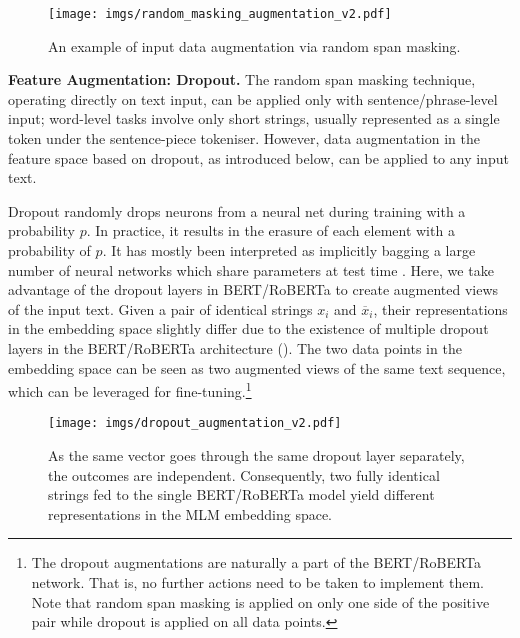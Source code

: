 \documentclass[11pt]{article}
\begin{document}
\begin{figure}
    \centering
    \texttt{[image: imgs/random\_masking\_augmentation\_v2.pdf]}
    \vspace{-1mm}
    \caption{An example of input data augmentation via random span masking.}
    \label{fig:random_mask_aug}
\end{figure}

\vspace{1.5mm}
\noindent \textbf{Feature Augmentation: Dropout.} 
The random span masking technique, operating directly on text input, can be applied only with sentence/phrase-level input; word-level tasks involve only short strings, usually represented as a single token under the sentence-piece tokeniser. However, data augmentation in the feature space based on dropout, as introduced below, can be applied to any input text. 

Dropout \citep{srivastava2014dropout} randomly drops neurons from a neural net during training with a probability $p$. In practice, it results in the erasure of each element with a probability of $p$. It has mostly been interpreted as implicitly bagging a large number of neural networks which share parameters at test time \citep{bouthillier2015dropout}. Here, we take advantage of the dropout layers in BERT/RoBERTa to create augmented views of the input text. Given a pair of identical strings $x_i$ and $\overline{x}_i$, their representations in the embedding space slightly differ due to the existence of multiple dropout layers in the BERT/RoBERTa architecture (). The two data points in the embedding space can be seen as two augmented views of the same text sequence, which can be leveraged for fine-tuning.\footnote{The dropout augmentations are naturally a part of the BERT/RoBERTa network. That is, no further actions need to be taken to implement them. Note that random span masking is applied on only one side of the positive pair while dropout is applied on all data points.}




\begin{figure}
    \centering
    \texttt{[image: imgs/dropout\_augmentation\_v2.pdf]}
\caption{As the same vector goes through the same dropout layer separately, the outcomes are independent. Consequently, two fully identical strings fed to the single BERT/RoBERTa model yield different representations in the MLM embedding space.}
    \label{fig:dropout_aug}
\end{figure}
\end{document}
